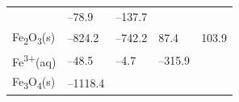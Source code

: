 \documentclass[
]{book}
\theoremstyle{definition}
\theoremstyle{definition}
\theoremstyle{definition}
\theoremstyle{remark}
\begin{document}
\begin{longtable}[]{@{}lllll@{}}
\begin{minipage}[t]{0.19\columnwidth}
\end{minipage} & \begin{minipage}[t]{0.20\columnwidth}\raggedright
--78.9\strut
\end{minipage} & \begin{minipage}[t]{0.18\columnwidth}\raggedright
--137.7 \textbar{}\strut
\end{minipage} & \begin{minipage}[t]{0.18\columnwidth}\raggedright
\strut
\end{minipage}\tabularnewline
\begin{minipage}[t]{0.10\columnwidth}\raggedright
Fe\textsubscript{2}O\textsubscript{3}(s)\strut
\end{minipage} & \begin{minipage}[t]{0.19\columnwidth}\raggedright
--824.2\strut
\end{minipage} & \begin{minipage}[t]{0.20\columnwidth}\raggedright
--742.2\strut
\end{minipage} & \begin{minipage}[t]{0.18\columnwidth}\raggedright
87.4\strut
\end{minipage} & \begin{minipage}[t]{0.18\columnwidth}\raggedright
103.9\strut
\end{minipage}\tabularnewline
\begin{minipage}[t]{0.10\columnwidth}\raggedright
Fe\textsuperscript{3+}(aq)\strut
\end{minipage} & \begin{minipage}[t]{0.19\columnwidth}\raggedright
--48.5\strut
\end{minipage} & \begin{minipage}[t]{0.20\columnwidth}\raggedright
--4.7\strut
\end{minipage} & \begin{minipage}[t]{0.18\columnwidth}\raggedright
--315.9 \textbar{}\strut
\end{minipage} & \begin{minipage}[t]{0.18\columnwidth}\raggedright
\strut
\end{minipage}\tabularnewline
\begin{minipage}[t]{0.10\columnwidth}\raggedright
Fe\textsubscript{3}O\textsubscript{4}(s)\strut
\end{minipage} & \begin{minipage}[t]{0.19\columnwidth}\raggedright
--1118.4\strut
\end{minipage} & \begin{minipage}[t]{0.20\columnwidth}\raggedright

\end{minipage}
\end{longtable}
\end{document}
